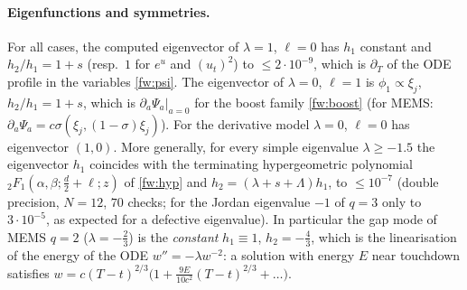 \paragraph{Eigenfunctions and symmetries.}
For all cases, the computed eigenvector of $\lambda=1$, $\ell=0$ has $h_1$
constant and $h_2/h_1=1+s$ (resp.\ $1$ for $e^u$ and $(u_t)^2$) to $\le2\cdot10^{-9}$,
which is $\partial_T$ of the ODE profile in the variables \eqref{fw:psi}. The
eigenvector of $\lambda=0$, $\ell=1$ is $\phi_1\propto\xi_j$, $h_2/h_1=1+s$, which is
$\partial_a\Psi_a|_{a=0}$ for the boost family \eqref{fw:boost} (for MEMS:
$\partial_a\Psi_a=c\sigma(\xi_j,(1-\sigma)\xi_j)$). For the derivative model
$\lambda=0$, $\ell=0$ has eigenvector $(1,0)$. More generally, for every simple
eigenvalue $\lambda\ge-1.5$ the eigenvector $h_1$ coincides with the
terminating hypergeometric polynomial ${}_2F_1(\alpha,\beta;\frac d2+\ell;z)$ of
\eqref{fw:hyp} and $h_2=(\lambda+s+\Lambda)h_1$, to $\le10^{-7}$ (double
precision, $N=12$, $70$ checks; for the Jordan eigenvalue $-1$ of $q=3$ only to
$3\cdot10^{-5}$, as expected for a defective eigenvalue). In particular the gap mode of MEMS $q=2$ ($\lambda=-\frac23$)
is the \emph{constant} $h_1\equiv1$, $h_2=-\frac43$, which is the
linearisation of the energy of the ODE $w''=-\lambda w^{-2}$: a solution with
energy $E$ near touchdown satisfies
$w=c(T-t)^{2/3}\big(1+\tfrac{9E}{10c^2}(T-t)^{2/3}+\dots\big)$.

